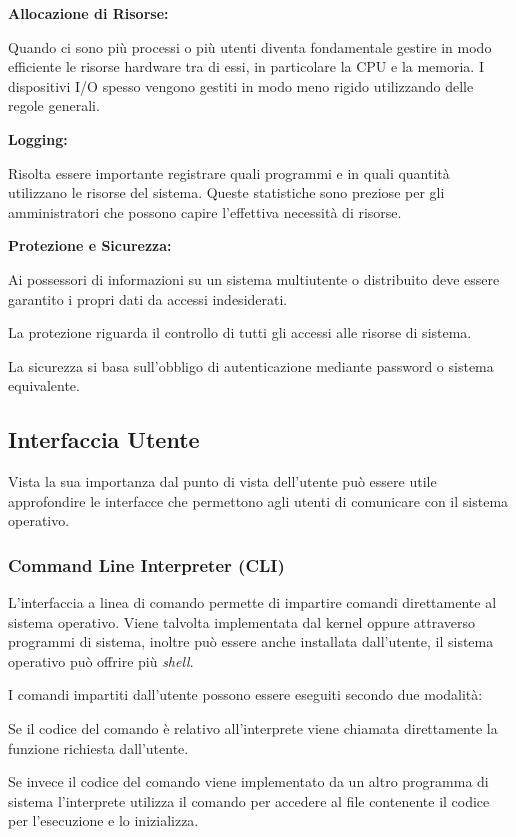 \begin{sitemize}
    \item \textbf{Allocazione di Risorse:}

    Quando ci sono più processi o più utenti diventa fondamentale gestire in modo efficiente le risorse hardware tra di essi, in particolare la CPU e la memoria.
    I dispositivi I/O spesso vengono gestiti in modo meno rigido utilizzando delle regole generali.

    \item \textbf{Logging:}

    Risolta essere importante registrare quali programmi e in quali quantità utilizzano le risorse del sistema.
    Queste statistiche sono preziose per gli amministratori che possono capire l'effettiva necessità di risorse.

    \item \textbf{Protezione e Sicurezza:}

    Ai possessori di informazioni su un sistema multiutente o distribuito deve essere garantito i propri dati da accessi indesiderati.

    La protezione riguarda il controllo di tutti gli accessi alle risorse di sistema.

    La sicurezza si basa sull'obbligo di autenticazione mediante password o sistema equivalente.
\end{sitemize}

\subsection{Interfaccia Utente}
Vista la sua importanza dal punto di vista dell'utente può essere utile approfondire le interfacce che permettono agli utenti di comunicare con il sistema operativo.

\subsubsection*{Command Line Interpreter (CLI)}

L'interfaccia a linea di comando permette di impartire comandi direttamente al sistema operativo.
Viene talvolta implementata dal kernel oppure attraverso programmi di sistema, inoltre può essere anche installata dall'utente, il sistema operativo può offrire più \textit{shell}.

\spacer
I comandi impartiti dall'utente possono essere eseguiti secondo due modalità:

\begin{sitemize}
    \item Se il codice del comando è relativo all'interprete viene chiamata direttamente la funzione richiesta dall'utente.

    \item Se invece il codice del comando viene implementato da un altro programma di sistema l'interprete utilizza il comando per accedere al file contenente il codice per l'esecuzione e lo inizializza.
\end{sitemize}

